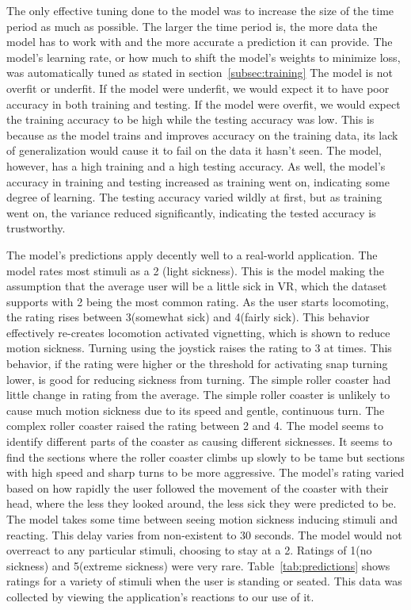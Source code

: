 The only effective tuning done to the model was to increase the size of the time period as much as possible.
The larger the time period is, the more data the model has to work with and the more accurate a prediction it can provide.
The model's learning rate, or how much to shift the model's weights to minimize loss, was automatically tuned as stated in section~\ref{subsec:training}
The model is not overfit or underfit.
If the model were underfit, we would expect it to have poor accuracy in both training and testing.
If the model were overfit, we would expect the training accuracy to be high while the testing accuracy was low.
This is because as the model trains and improves accuracy on the training data, its lack of generalization would cause it to fail on the data it hasn't seen.
The model, however, has a high training and a high testing accuracy.
As well, the model's accuracy in training and testing increased as training went on, indicating some degree of learning.
The testing accuracy varied wildly at first, but as training went on, the variance reduced significantly, indicating the tested accuracy is trustworthy.

The model's predictions apply decently well to a real-world application.
The model rates most stimuli as a 2 (light sickness).
This is the model making the assumption that the average user will be a little sick in VR, which the dataset supports with 2 being the most common rating.
As the user starts locomoting, the rating rises between 3(somewhat sick) and 4(fairly sick).
This behavior effectively re-creates locomotion activated vignetting, which is shown to reduce motion sickness.
Turning using the joystick raises the rating to 3 at times.
This behavior, if the rating were higher or the threshold for activating snap turning lower, is good for reducing sickness from turning.
The simple roller coaster had little change in rating from the average.
The simple roller coaster is unlikely to cause much motion sickness due to its speed and gentle, continuous turn.
The complex roller coaster raised the rating between 2 and 4.
The model seems to identify different parts of the coaster as causing different sicknesses.
It seems to find the sections where the roller coaster climbs up slowly to be tame but sections with high speed and sharp turns to be more aggressive.
The model's rating varied based on how rapidly the user followed the movement of the coaster with their head, where the less they looked around, the less sick they were predicted to be.
The model takes some time between seeing motion sickness inducing stimuli and reacting.
This delay varies from non-existent to 30 seconds.
The model would not overreact to any particular stimuli, choosing to stay at a 2.
Ratings of 1(no sickness) and 5(extreme sickness) were very rare.
Table~\ref{tab:predictions} shows ratings for a variety of stimuli when the user is standing or seated.
This data was collected by viewing the application's reactions to our use of it.


